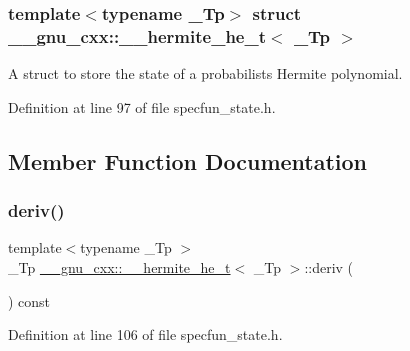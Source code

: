 \subsubsection*{template$<$typename \+\_\+\+Tp$>$\newline
struct \+\_\+\+\_\+gnu\+\_\+cxx\+::\+\_\+\+\_\+hermite\+\_\+he\+\_\+t$<$ \+\_\+\+Tp $>$}

A struct to store the state of a probabilists Hermite polynomial. 

Definition at line 97 of file specfun\+\_\+state.\+h.



\subsection{Member Function Documentation}
\mbox{\label{struct____gnu__cxx_1_1____hermite__he__t_a19c1df6940043e1b106b8cf70bddd60e}} 
\subsubsection{\texorpdfstring{deriv()}{deriv()}}
{\footnotesize\ttfamily template$<$typename \+\_\+\+Tp $>$ \\
\+\_\+\+Tp \hyperlink{struct____gnu__cxx_1_1____hermite__he__t}{\+\_\+\+\_\+gnu\+\_\+cxx\+::\+\_\+\+\_\+hermite\+\_\+he\+\_\+t}$<$ \+\_\+\+Tp $>$\+::deriv (\begin{DoxyParamCaption}{ }\end{DoxyParamCaption}) const\hspace{0.3cm}{\ttfamily [inline]}}



Definition at line 106 of file specfun\+\_\+state.\+h.

\mbox{\label{struct____gnu__cxx_1_1____hermite__he__t_a4d885a96a96b12e9e8b6ad62628cfff3}} 
